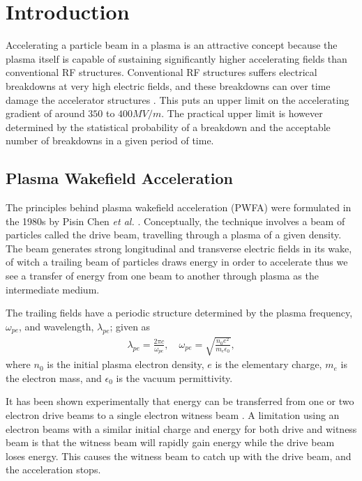 %
%

\chapter{Introduction}
\label{Ch:Intro}

Accelerating a particle beam in a plasma is an attractive concept because the plasma itself is capable of sustaining significantly higher accelerating fields than conventional RF structures. Conventional RF structures suffers electrical breakdowns at very high electric fields, and these breakdowns can over time damage the accelerator structures \cite{braun:2003}. This puts an upper limit on the accelerating gradient of around $350$ to $400\unit{MV/m}$. The practical upper limit is however determined by the statistical probability of a breakdown and the acceptable number of breakdowns in a given period of time.\cite{pritzkau:2002} 

\section{Plasma Wakefield Acceleration}
\label{Int:PWFA}

The principles behind plasma wakefield acceleration (PWFA) were formulated in the 1980s by Pisin Chen \emph{et al.} \cite{chen:1985}. Conceptually, the technique involves a beam of particles called the drive beam, travelling through a plasma of a given density. The beam generates strong longitudinal and transverse electric fields in its wake, of witch a trailing beam of particles draws energy in order to accelerate \dash thus we see a transfer of energy from one beam to another through plasma as the intermediate medium.

The trailing fields have a periodic structure determined by the plasma frequency, $\omega_{pe}$, and wavelength, $\lambda_{pe}$; given as
\begin{align}
    \lambda_{pe} = \frac{2\pi c}{\omega_{pe}}, \quad \omega_{pe} = \sqrt{\frac{n_{0}e^{2}}{m_{e}\epsilon_{0}}}, \label{EQ:PWFA:L0W0}
\end{align}
where $n_{0}$ is the initial plasma electron density, $e$ is the elementary charge, $m_{e}$ is the electron mass, and $\epsilon_{0}$ is the vacuum permittivity.

It has been shown experimentally that energy can be transferred from one or two electron drive beams to a single electron witness beam \cite{rosenzweig:1988, blumenfeld:2007, kallos:2008}. A limitation using an electron beams with a similar initial charge and energy for both drive and witness beam is that the witness beam will rapidly gain energy while the drive beam loses energy. This causes the witness beam to catch up with the drive beam, and the acceleration stops. 

